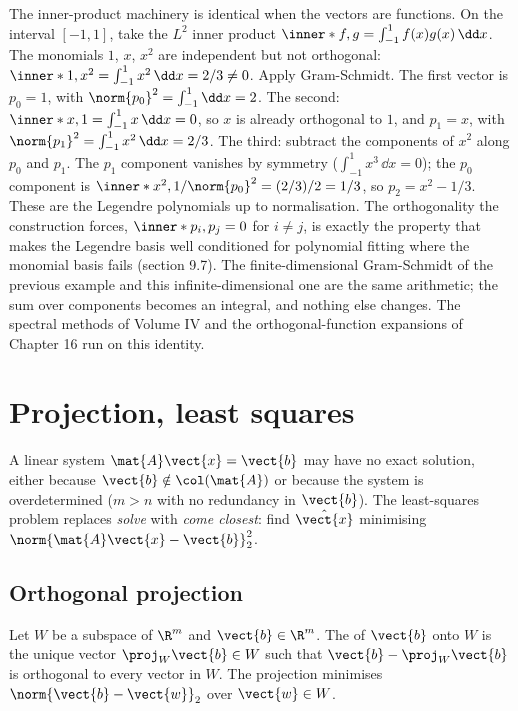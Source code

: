\begin{example}
The inner-product machinery is identical when the vectors are
functions. On the interval $[-1, 1]$, take the $L^{2}$ inner product
$\inner*{f, g} = \int_{-1}^{1} f(x) g(x)\,\dd x$. The monomials
$1$, $x$, $x^{2}$ are independent but not orthogonal: $\inner*{1, x^{2}}
= \int_{-1}^{1} x^{2}\,\dd x = 2/3 \neq 0$. Apply Gram-Schmidt. The
first vector is $p_{0} = 1$, with $\norm{p_{0}}^{2} = \int_{-1}^{1}
\dd x = 2$. The second: $\inner*{x, 1} = \int_{-1}^{1} x\,\dd x = 0$,
so $x$ is already orthogonal to $1$, and $p_{1} = x$, with
$\norm{p_{1}}^{2} = \int_{-1}^{1} x^{2}\,\dd x = 2/3$. The third:
subtract the components of $x^{2}$ along $p_{0}$ and $p_{1}$. The
$p_{1}$ component vanishes by symmetry ($\int_{-1}^{1} x^{3}\,\dd x =
0$); the $p_{0}$ component is $\inner*{x^{2}, 1}/\norm{p_{0}}^{2} =
(2/3)/2 = 1/3$, so $p_{2} = x^{2} - 1/3$. These are the Legendre
polynomials up to normalisation. The orthogonality the construction
forces, $\inner*{p_{i}, p_{j}} = 0$ for $i \neq j$, is exactly the
property that makes the Legendre basis well conditioned for
polynomial fitting where the monomial basis fails (section 9.7). The
finite-dimensional Gram-Schmidt of the previous example and this
infinite-dimensional one are the same arithmetic; the sum over
components becomes an integral, and nothing else changes. The
spectral methods of Volume IV and the orthogonal-function expansions
of Chapter 16 run on this identity.
\end{example}

\section{Projection, least squares}

A linear system $\mat{A}\vect{x} = \vect{b}$ may have no exact
solution, either because $\vect{b} \notin \col(\mat{A})$ or because
the system is overdetermined ($m > n$ with no redundancy in
$\vect{b}$). The least-squares problem replaces \emph{solve} with
\emph{come closest}: find $\hat{\vect{x}}$ minimising
$\norm{\mat{A}\vect{x} - \vect{b}}_{2}^{2}$.

\subsection{Orthogonal projection}

Let $W$ be a subspace of $\R^{m}$ and $\vect{b} \in \R^{m}$. The
 of $\vect{b}$ onto $W$ is the
unique vector $\proj_{W}\vect{b} \in W$ such that $\vect{b} -
\proj_{W}\vect{b}$ is orthogonal to every vector in $W$. The
projection minimises $\norm{\vect{b} - \vect{w}}_{2}$ over
$\vect{w} \in W$.

